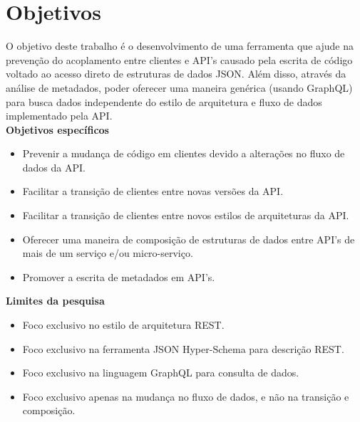\section[Objetivos]{Objetivos}

O objetivo deste trabalho é o desenvolvimento de uma ferramenta que ajude na prevenção do acoplamento entre clientes e API's causado pela escrita de código voltado ao acesso direto de estruturas de dados JSON. Além disso, através da análise de metadados, poder oferecer uma maneira genérica (usando GraphQL) para busca dados independente do estilo de arquitetura e fluxo de dados implementado pela API. \\

\textbf{Objetivos específicos} \\

\begin{itemize}
\item Prevenir a mudança de código em clientes devido a alterações no fluxo de dados da API.
\item Facilitar a transição de clientes entre novas versões da API.
\item Facilitar a transição de clientes entre novos estilos de arquiteturas da API.
\item Oferecer uma maneira de composição de estruturas de dados entre API's de mais de um serviço e/ou micro-serviço.
\item Promover a escrita de metadados em API's. \\
\end{itemize}

\textbf{Limites da pesquisa} \\

\begin{itemize}
\item Foco exclusivo no estilo de arquitetura REST.
\item Foco exclusivo na ferramenta JSON Hyper-Schema para descrição REST.
\item Foco exclusivo na linguagem GraphQL para consulta de dados.
\item Foco exclusivo apenas na mudança no fluxo de dados, e não na transição e composição.
\end{itemize}